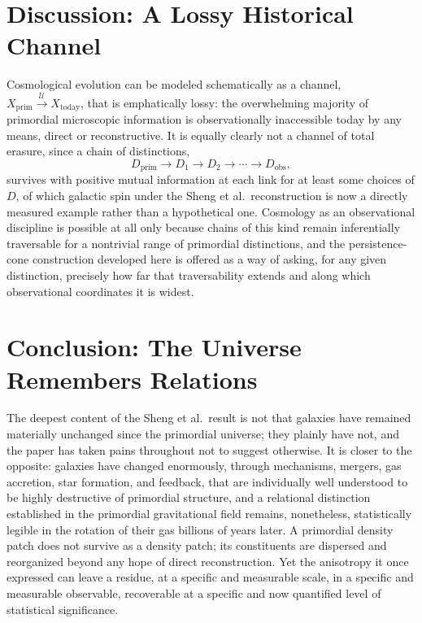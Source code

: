 \documentclass[11pt]{article}
\begin{document}
\section{Discussion: A Lossy Historical Channel}

Cosmological evolution can be modeled schematically as a channel, $X_{\mathrm{prim}} \xrightarrow{\mathcal U} X_{\mathrm{today}}$, that is emphatically lossy: the overwhelming majority of primordial microscopic information is observationally inaccessible today by any means, direct or reconstructive. It is equally clearly not a channel of total erasure, since a chain of distinctions,
\begin{equation}
D_{\mathrm{prim}} \to D_1 \to D_2 \to \cdots \to D_{\mathrm{obs}},
\end{equation}
survives with positive mutual information at each link for at least some choices of $D$, of which galactic spin under the Sheng et al.\ reconstruction is now a directly measured example rather than a hypothetical one. Cosmology as an observational discipline is possible at all only because chains of this kind remain inferentially traversable for a nontrivial range of primordial distinctions, and the persistence-cone construction developed here is offered as a way of asking, for any given distinction, precisely how far that traversability extends and along which observational coordinates it is widest.

\section{Conclusion: The Universe Remembers Relations}

The deepest content of the Sheng et al.\ result is not that galaxies have remained materially unchanged since the primordial universe; they plainly have not, and the paper has taken pains throughout not to suggest otherwise. It is closer to the opposite: galaxies have changed enormously, through mechanisms, mergers, gas accretion, star formation, and feedback, that are individually well understood to be highly destructive of primordial structure, and a relational distinction established in the primordial gravitational field remains, nonetheless, statistically legible in the rotation of their gas billions of years later. A primordial density patch does not survive as a density patch; its constituents are dispersed and reorganized beyond any hope of direct reconstruction. Yet the anisotropy it once expressed can leave a residue, at a specific and measurable scale, in a specific and measurable observable, recoverable at a specific and now quantified level of statistical significance.
\end{document}
